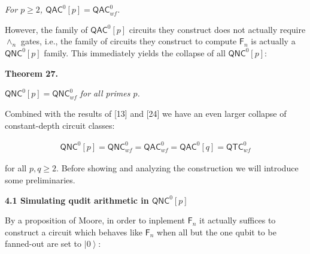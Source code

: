 \emph{For $p\geq 2$, ${\mathsf{QAC}}^{0}[p]={\mathsf{QAC}}^{0}_{wf}$.}\par






However, the family of ${\mathsf{QAC}}^{0}[p]$ circuits they construct does not actually require $\wedge_{n}$ gates, i.e., the family of circuits they construct to compute $\mathsf{F}_{n}$ is actually a ${\mathsf{QNC}}^{0}[p]$ family. This immediately yields the collapse of all ${\mathsf{QNC}}^{0}[p]$:\par





\par\medskip\noindent\textbf{
\textbf{Theorem 27}\textbf{.}
}\par



${\mathsf{QNC}}^{0}[p]={\mathsf{QNC}}^{0}_{wf}$\emph{ for all primes $p$.}\par






Combined with the results of [13] and [24] we have an even larger collapse of constant-depth circuit classes:\par


\[\begin{gathered}
{\mathsf{QNC}}^{0}[p]={\mathsf{QNC}}^{0}_{wf}={\mathsf{QAC}}^{0}_{wf}={\mathsf{QAC}}^{0}[q]={\mathsf{QTC}}^{0}_{wf}
\end{gathered}\]


for all $p,q\geq 2$. Before showing and analyzing the construction we will introduce some preliminaries.\par




\par\medskip\noindent\textbf{
4.1 Simulating qudit arithmetic in ${\mathsf{QNC}}^{0}[p]$
}\par




By a proposition of Moore, in order to inplement $\mathsf{F}_{n}$ it actually suffices to construct a circuit which behaves like $\mathsf{F}_{n}$ when all but the one qubit to be fanned-out are set to $\left|0\right\rangle$:\par



